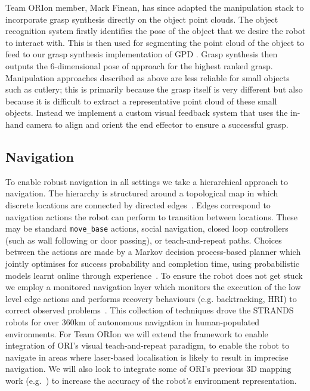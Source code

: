 \documentclass[runningheads,a4paper]{llncs}
\newcommand{\teamori}{Team ORIon}
\begin{document}
Team ORIon member, Mark Finean, has since adapted the manipulation stack to incorporate grasp synthesis directly on the object point clouds. The object recognition system firstly identifies the pose of the object that we desire the robot to interact with. This is then used for segmenting the point cloud of the object to feed to our grasp synthesis implementation of GPD \cite{GPD1} \cite{GPD2}. Grasp synthesis then outputs the 6-dimensional pose of approach for the highest ranked grasp.
Manipulation approaches described as above are less reliable for small objects such as cutlery; this is primarily because the grasp itself is very different but also because it is difficult to extract a representative point cloud of these small objects. Instead we implement a custom visual feedback system that uses the in-hand camera to align and orient the end effector to ensure a successful grasp.  

\subsection{Navigation}

To enable robust navigation in all settings we take a hierarchical approach to navigation. The hierarchy is structured around a topological map in which discrete locations are connected by directed edges~\cite{jpulido2015NowOrLater}. Edges correspond to navigation actions the robot can perform to transition between locations. These may be standard \texttt{move\_base} actions, social navigation, closed loop controllers (such as wall following or door passing), or teach-and-repeat paths. Choices between the actions are made by a Markov decision process-based planner which jointly optimises for success probability and completion time, using probabilistic models learnt online through experience~\cite{LPH14b}. To ensure the robot does not get stuck we employ a monitored navigation layer which monitors the execution of the low level edge actions and performs recovery behaviours (e.g. backtracking, HRI) to correct observed problems~\cite{strands@ram}. This collection of techniques drove the STRANDS robots for over 360km of autonomous navigation in human-populated environments. For \teamori{} we will extend the framework to enable integration of ORI's visual teach-and-repeat paradigm, to enable the robot to navigate in areas where laser-based localisation is likely to result in imprecise navigation. We will also look to integrate some of ORI's previous 3D mapping work (e.g.~\cite{AmayoICRA2016}) to increase the accuracy of the robot's environment representation.
\end{document}
